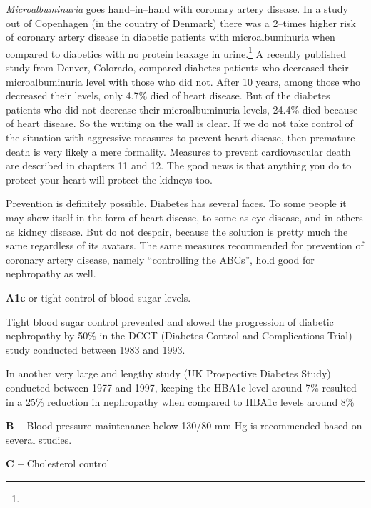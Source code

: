 {\textit{Microalbuminuria} goes hand–in–hand with coronary artery disease. In a study out of Copenhagen (in the country of Denmark) there was a 2–times higher risk of coronary artery disease in diabetic patients with microalbuminuria when compared to diabetics with no protein leakage in urine.\footnote{} A recently published study from Denver, Colorado, compared diabetes patients who decreased their microalbuminuria level with those who did not. After 10 years, among those who decreased their levels, only 4.7\% died of heart disease. But of the diabetes patients who did not decrease their microalbuminuria levels, 24.4\% died because of heart disease. So the writing on the wall is clear.  If we do not take control of the situation with aggressive measures to prevent heart disease, then premature death is very likely a mere formality. Measures to prevent cardiovascular death are described in chapters 11 and 12. The good news is that anything you do to protect your heart will protect the kidneys too.


Prevention is definitely possible. Diabetes has several faces. To some people it may show itself in the form of heart disease, to some as eye disease, and in others as kidney disease. But do not despair, because the solution is pretty much the same regardless of its avatars. The same measures recommended for prevention of coronary artery disease, namely “controlling the ABCs”, hold good for nephropathy as well.

\item 
 \textbf{A1c} or tight control of blood sugar levels.

 Tight blood sugar control prevented and slowed the progression of diabetic nephropathy by 50\% in the DCCT (Diabetes Control and Complications Trial) study conducted between 1983 and 1993.

 In another very large and lengthy study (UK Prospective Diabetes Study) conducted between 1977 and 1997, keeping the HBA1c level around 7\% resulted in a 25\% reduction in nephropathy when compared to HBA1c levels around 8\%

 \item \textbf{B –} Blood pressure maintenance below 130/80 mm Hg is recommended based on several studies.

 \item \textbf{C –} Cholesterol control

}

